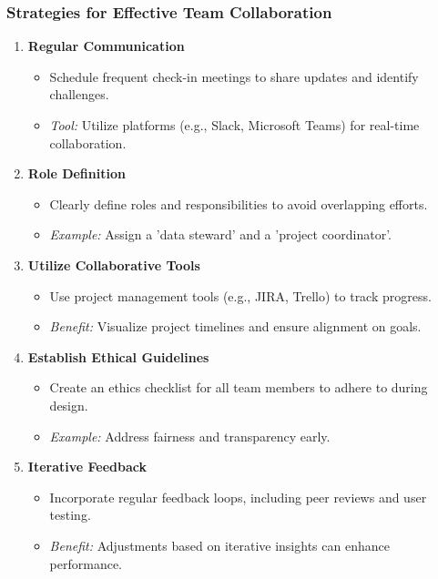 \documentclass[aspectratio=169]{beamer}
\begin{document}
\begin{frame}[fragile]
    \frametitle{Strategies for Effective Team Collaboration}
    \begin{enumerate}
        \item \textbf{Regular Communication}
        \begin{itemize}
            \item Schedule frequent check-in meetings to share updates and identify challenges.
            \item \textit{Tool:} Utilize platforms (e.g., Slack, Microsoft Teams) for real-time collaboration.
        \end{itemize}
        
        \item \textbf{Role Definition}
        \begin{itemize}
            \item Clearly define roles and responsibilities to avoid overlapping efforts.
            \item \textit{Example:} Assign a 'data steward' and a 'project coordinator'.
        \end{itemize}
        
        \item \textbf{Utilize Collaborative Tools}
        \begin{itemize}
            \item Use project management tools (e.g., JIRA, Trello) to track progress.
            \item \textit{Benefit:} Visualize project timelines and ensure alignment on goals.
        \end{itemize}
        
        \item \textbf{Establish Ethical Guidelines}
        \begin{itemize}
            \item Create an ethics checklist for all team members to adhere to during design.
            \item \textit{Example:} Address fairness and transparency early.
        \end{itemize}
        
        \item \textbf{Iterative Feedback}
        \begin{itemize}
            \item Incorporate regular feedback loops, including peer reviews and user testing.
            \item \textit{Benefit:} Adjustments based on iterative insights can enhance performance.
        \end{itemize}
    \end{enumerate}
\end{frame}
\end{document}
